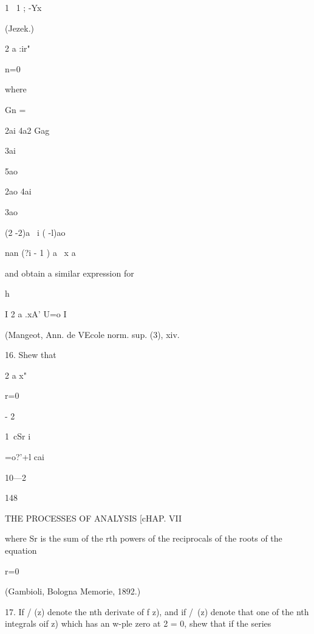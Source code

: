{{1 \  1 ;  -Yx  



(Jezek.) 



2 a :ir" 

n=0 



where 



Gn = 



2ai 
4a2 
Gag 



3ai 

5ao 





2ao 
4ai 







3ao 



(2 -2)a \ i ( -l)ao 

nan (?i - 1 ) a \ x a  

and obtain a similar expression for 

h 



I 2 a .xA' 
U=o I 

(Mangeot, Ann. de VEcole norm. sup. (3), xiv. 



16. Shew that 



2 a x"  

r=0 



- 2 



1\  cSr i 

=o?'+l cai 



10—2 



148 



THE PROCESSES OF ANALYSIS [cHAP. VII 



where Sr is the sum of the rth powers of the reciprocals of the roots of the equation 

r=0 

(Gambioli, Bologna Memorie, 1892.) 

17. If /  (z) denote the nth derivate of f z), and if /\   (z) denote that one of the nth 
integrals oif z) which has an w-ple zero at 2 = 0, shew that if the series 

}}
